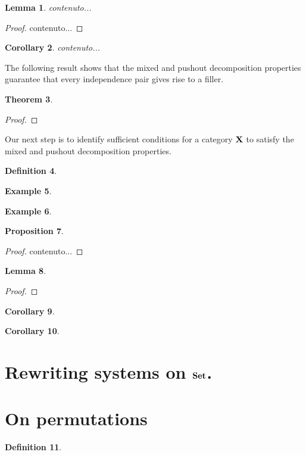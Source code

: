 \documentclass[a4paper]{article}
\def\X{\textbf {\textup{X}}}
\def\Set{\textbf {\textup{Set}}}
\newtheorem{theorem}{Theorem}[section]
\newtheorem{proposition}[theorem]{Proposition}
\newtheorem{lemma}[theorem]{Lemma}
\newtheorem{corollary}[theorem]{Corollary}
\theoremstyle{definition}
\newtheorem{definition}[theorem]{Definition}
\newtheorem{example}[theorem]{Example}
\begin{document}
\begin{lemma}
	contenuto...
\end{lemma}
\begin{proof}
	contenuto...\qedhere 
\end{proof}

\begin{corollary}
	contenuto...
\end{corollary}

The following result shows that the mixed and pushout decomposition properties guarantee that every independence pair gives rise to a filler.

\begin{theorem}
\end{theorem}
\begin{proof}\qedhere 
\end{proof}

Our next step is to identify sufficient conditions for a category $\X$ to satisfy the mixed and pushout decomposition properties.

\begin{definition}
\end{definition}

\begin{example}
\end{example}

\begin{example}
\end{example}

\begin{proposition}
\end{proposition}
\begin{proof}
	contenuto... \qedhere 
\end{proof}
\begin{lemma}
\end{lemma}
\begin{proof}
	\qedhere 
\end{proof}

\begin{corollary}
\end{corollary}

\begin{corollary}
\end{corollary}





\section{Rewriting systems on $\Set$.}\label{app:set}

\section{On permutations}\label{app:perm}


\begin{definition}
\end{definition}
\end{document}
